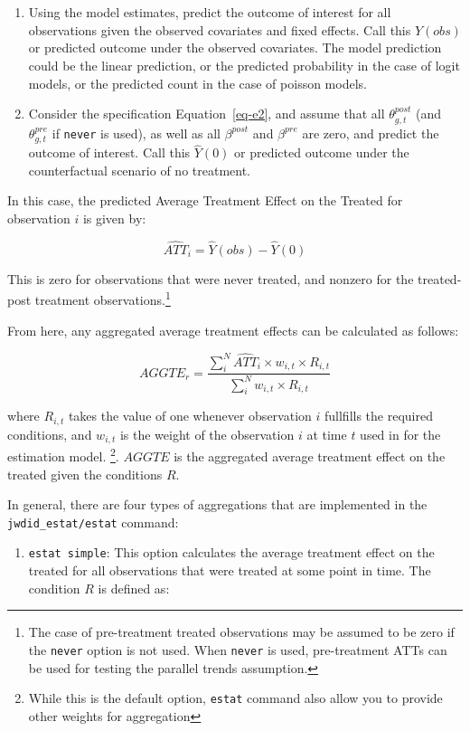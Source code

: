 \documentclass[
  letterpaper,
  DIV=11,
  numbers=noendperiod]{scrartcl}
\providecommand{\tightlist}{%
  \setlength{\itemsep}{0pt}\setlength{\parskip}{0pt}}\usepackage{longtable,booktabs,array}
\begin{document}
\begin{enumerate}
\def\labelenumi{\arabic{enumi}.}
\tightlist
\item
  Using the model estimates, predict the outcome of interest for all
  observations given the observed covariates and fixed effects. Call
  this \(\hat Y(obs)\) or predicted outcome under the observed
  covariates. The model prediction could be the linear prediction, or
  the predicted probability in the case of logit models, or the
  predicted count in the case of poisson models.
\item
  Consider the specification Equation~\ref{eq-e2}, and assume that all
  \(\theta^{post}_{g,t}\) (and \(\theta^{pre}_{g,t}\) if \texttt{never}
  is used), as well as all \(\beta^{post}\) and \(\beta^{pre}\) are
  zero, and predict the outcome of interest. Call this \(\hat Y(0)\) or
  predicted outcome under the counterfactual scenario of no treatment.
\end{enumerate}

In this case, the predicted Average Treatment Effect on the Treated for
observation \(i\) is given by:

\[\widehat{ATT}_i = \hat Y(obs) - \hat Y(0)\]

This is zero for observations that were never treated, and nonzero for
the treated-post treatment observations.\footnote{The case of
  pre-treatment treated observations may be assumed to be zero if the
  \texttt{never} option is not used. When \texttt{never} is used,
  pre-treatment ATTs can be used for testing the parallel trends
  assumption.}

From here, any aggregated average treatment effects can be calculated as
follows:

\[AGGTE_r =  \frac{ \sum_i^N\widehat{ATT}_i \times w_{i,t} \times R_{i,t}}{ \sum_i^N  w_{i,t} \times R_{i,t}}  
\]

where \(R_{i,t}\) takes the value of one whenever observation \(i\)
fullfills the required conditions, and \(w_{i,t}\) is the weight of the
observation \(i\) at time \(t\) used in for the estimation model.
\footnote{While this is the default option, \texttt{estat} command also
  allow you to provide other weights for aggregation}. \(AGGTE\) is the
aggregated average treatment effect on the treated given the conditions
\(R\).

In general, there are four types of aggregations that are implemented in
the \texttt{jwdid\_estat/estat} command:

\begin{enumerate}
\def\labelenumi{\arabic{enumi}.}
\tightlist
\item
  \texttt{estat\ simple}: This option calculates the average treatment
  effect on the treated for all observations that were treated at some
  point in time. The condition \(R\) is defined as:
\end{enumerate}
\end{document}
